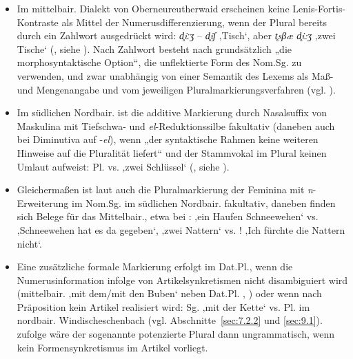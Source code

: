 \begin{itemize}
\sloppy
\item Im mittelbair. Dialekt von Oberneureutherwaid erscheinen keine Lenis-Fortis-Kontraste als Mittel der Numerusdifferenzierung, wenn der Plural bereits durch ein Zahlwort ausgedrückt wird: \textit{d̥iːʒ} -- \textit{d̥iʃ} ‚Tisch‘, aber \textit{t̥sβæ d̥i:ʒ} ‚zwei Tische‘ (\citealt[124]{Steininger1994}, siehe ). Nach Zahlwort besteht nach \citet[105]{Rowley1997} grundsätzlich „die morphosyntaktische Option“, die unflektierte Form des Nom.Sg. zu verwenden, und zwar unabhängig von einer Semantik des Lexems als Maß- und Mengenangabe und vom jeweiligen Pluralmarkierungsverfahren (vgl. ).
\item Im südlichen Nordbair. ist die additive Markierung durch Nasalsuffix von Maskulina mit Tiefschwa- und \textit{el}{}-Reduktionssilbe fakultativ (daneben auch bei Diminutiva auf -\textit{el}), wenn „der syntaktische Rahmen keine weiteren Hinweise auf die Pluralität liefert“ \citep[158]{Rowley1997} und der Stammvokal im Plural keinen Umlaut aufweist: Pl.  vs.   ‚zwei Schlüssel‘ (\citealt[421]{Schirmunski1962}, siehe ).
\item Gleichermaßen ist laut \citet[158]{Rowley1997} auch die Pluralmarkierung der Feminina mit \textit{n}{}-Erweiterung im Nom.Sg. im südlichen Nordbair. fakultativ, daneben finden sich Belege für das Mittelbair., etwa bei \citet[§140.7]{Kollmer1987}:    ‚ein Haufen Schneewehen‘ vs.     ‚Schneewehen hat es da gegeben‘,   ‚zwei Nattern‘ vs.     ! ‚Ich fürchte die Nattern nicht‘.
\item Eine zusätzliche formale Markierung erfolgt im Dat.Pl., wenn die Numerusinformation infolge von Artikelsynkretismen nicht disambiguiert wird (mittelbair.   ‚mit dem/mit den Buben‘ neben Dat.Pl.  , \citealt[§12]{Weitzenböck1942}) oder wenn nach Präposition kein Artikel realisiert wird: Sg.   ‚mit der Kette‘ vs. Pl.   im nordbair. Windischeschenbach (vgl. Abschnitte~\ref{sec:7.2.2} und \ref{sec:9.1}). \citet[124]{Steininger1994} zufolge wäre der sogenannte potenzierte Plural dann ungrammatisch, wenn kein Formensynkretismus im Artikel vorliegt.
\end{itemize}

